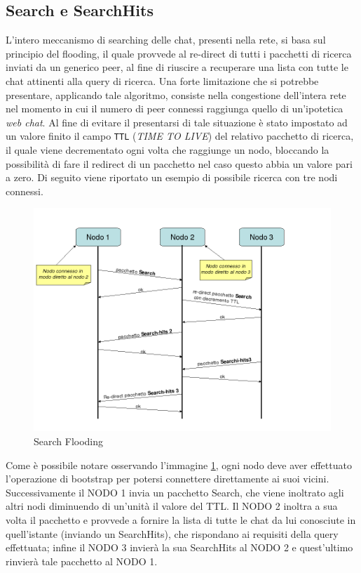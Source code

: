 \subsection{Search e SearchHits}
L'intero meccanismo di searching delle chat, presenti nella rete, si basa sul principio del flooding, il quale provvede al re-direct di tutti i pacchetti di ricerca inviati da un generico peer, al fine di riuscire a recuperare una lista con tutte le chat attinenti alla query di ricerca.
Una forte limitazione che si potrebbe presentare, applicando tale algoritmo, consiste nella congestione dell'intera rete nel momento in cui il numero di peer connessi raggiunga quello di un'ipotetica \textit{web chat}. Al fine di evitare il presentarsi di tale situazione è stato impostato ad un valore finito il campo \texttt{TTL} (\textit{TIME TO LIVE}) del relativo pacchetto di ricerca, il quale viene decrementato ogni volta che raggiunge un nodo, bloccando la possibilità di fare il redirect di un pacchetto nel caso questo abbia un valore pari a zero.
Di seguito viene riportato un esempio di possibile ricerca con tre nodi connessi.
\begin{figure}[H]
\begin{center}
\includegraphics[scale=0.5]{etc/Search.png}
\caption{Search Flooding}
\label{searchflooding}
\end{center}
\end{figure}
Come è possibile notare osservando l'immagine \ref{searchflooding}, ogni nodo deve aver effettuato l'operazione di bootstrap per potersi connettere direttamente ai suoi  vicini. Successivamente il NODO 1 invia un pacchetto Search, che viene inoltrato agli altri nodi diminuendo di un'unità il valore del TTL. Il NODO 2 inoltra a sua volta il pacchetto e provvede a fornire la lista di tutte le chat da lui conosciute in quell'istante (inviando un SearchHits), che rispondano ai requisiti della query effettuata; infine il NODO 3 invierà la sua SearchHits al NODO 2 e quest'ultimo rinvierà tale pacchetto al NODO 1.
